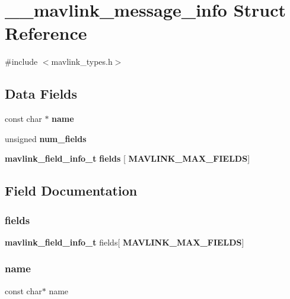 \section{\+\_\+\+\_\+mavlink\+\_\+message\+\_\+info Struct Reference}
\label{struct____mavlink__message__info}


{\ttfamily \#include $<$mavlink\+\_\+types.\+h$>$}

\subsection*{Data Fields}
\begin{DoxyCompactItemize}
\item 
const char $\ast$ \textbf{ name}
\item 
unsigned \textbf{ num\+\_\+fields}
\item 
\textbf{ mavlink\+\_\+field\+\_\+info\+\_\+t} \textbf{ fields} [\textbf{ M\+A\+V\+L\+I\+N\+K\+\_\+\+M\+A\+X\+\_\+\+F\+I\+E\+L\+DS}]
\end{DoxyCompactItemize}


\subsection{Field Documentation}
\mbox{\label{struct____mavlink__message__info_abee426c88ab46470e12d1c946a1d2fe0}} 
\subsubsection{fields}
{\footnotesize\ttfamily \textbf{ mavlink\+\_\+field\+\_\+info\+\_\+t} fields[\textbf{ M\+A\+V\+L\+I\+N\+K\+\_\+\+M\+A\+X\+\_\+\+F\+I\+E\+L\+DS}]}

\mbox{\label{struct____mavlink__message__info_a8f8f80d37794cde9472343e4487ba3eb}} 
\subsubsection{name}
{\footnotesize\ttfamily const char$\ast$ name}

